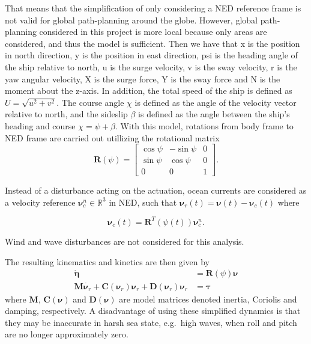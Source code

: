 That means that the simplification of only considering a NED reference frame is not valid for global path-planning around the globe. However, global path-planning considered in this project is more local because only areas are considered, and thus the model is sufficient. Then we have that \gls{x} is the position in north direction, \gls{y} is the position in east direction, \gls{psi} is the heading angle of the ship relative to north, \gls{u} is the surge velocity, \gls{v} is the sway velocity, \gls{r} is the yaw angular velocity, \gls{X} is the surge force, \gls{Y} is the sway force and \gls{N} is the moment about the z-axis. In addition, the total speed of the ship is defined as $U=\sqrt{u^2+v^2}$. The course angle $\chi$ is defined as the angle of the velocity vector relative to north, and the sideslip $\beta$ is defined as the angle between the ship's heading and course $\chi = \psi + \beta$. With this model, rotations from body frame to NED frame are carried out utillizing the rotational matrix
\begin{equation}
\boldsymbol{R}(\psi) = \begin{bmatrix} 
\cos\psi &-\sin\psi & 0 \\
\sin\psi & \cos\psi & 0 \\
0 & 0 & 1
\end{bmatrix}.
\end{equation}



Instead of a disturbance acting on the actuation, ocean currents are considered as a velocity reference $\boldsymbol{\nu}_c^n \in \mathbb{R}^3$ in NED, such that $\boldsymbol{\nu}_r(t) = \boldsymbol{\nu}(t) - \boldsymbol{\nu}_c(t)$ where 

\begin{equation}
\boldsymbol{\nu}_c(t) = \boldsymbol{R}^T(\psi(t)) \boldsymbol{\nu}_c^n.
\end{equation}

 Wind and wave disturbances are not considered for this analysis.

The resulting kinematics and kinetics are then given by
\begin{subequations} 
	\begin{align}
	\dot{\boldsymbol{\eta}} &= \boldsymbol{R}(\psi)\boldsymbol{\nu} \\ 
	\boldsymbol{M}\dot{\boldsymbol{\nu}_r}+\boldsymbol{C}(\boldsymbol{\nu}_r)\boldsymbol{\nu}_r + \boldsymbol{D}(\boldsymbol{\nu}_r)\boldsymbol{\nu}_r  &= \boldsymbol{\tau}
	\end{align}
\end{subequations}
where $\boldsymbol{M}$, $\boldsymbol{C}(\boldsymbol{\nu})$ and $\boldsymbol{D}(\boldsymbol{\nu})$ are model matrices denoted inertia, Coriolis and damping, respectively.
A disadvantage of using these simplified dynamics is that they may be inaccurate in harsh sea state, e.g.\ high waves, when roll and pitch are no longer approximately zero. 

